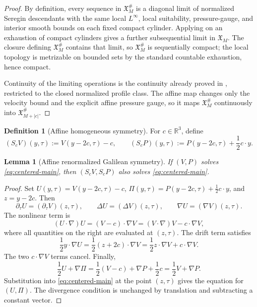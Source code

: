 \documentclass[11pt]{amsart}
\numberwithin{equation}{section}
\theoremstyle{plain}
\newtheorem{lemma}[lemma]{Lemma}
\theoremstyle{definition}
\newtheorem{definition}[definition]{Definition}
\theoremstyle{remark}
\newcommand{\R}{\mathbb R}
\begin{document}
\begin{proof}
By definition, every sequence in \(\mathfrak X_M^\#\) is a diagonal limit of
normalized Seregin descendants with the same local \(L^\infty\), local
suitability, pressure-gauge, and interior smooth bounds on each fixed compact
cylinder.  Applying  on an exhaustion of
compact cylinders gives a further subsequential limit in \(\mathfrak X_M\).  The
closure defining \(\mathfrak X_M^\#\) contains that limit, so
\(\mathfrak X_M^\#\) is sequentially compact; the local topology is metrizable on
bounded sets by the standard countable exhaustion, hence compact.

Continuity of the limiting operations is the continuity already proved in
, restricted to the closed normalized
profile class.  The affine map changes only the velocity bound and the explicit
affine pressure gauge, so it maps \(\mathfrak X_M^\#\) continuously into
\(\mathfrak X_{M+|c|}^\#\).
\end{proof}

\begin{definition}[Affine homogeneous symmetry]
\label{def:affine-symmetry}
For \(c\in\R^3\), define
\[
   (S_cV)(y,\tau):=V(y-2c,\tau)-c,
   \qquad
   (S_cP)(y,\tau):=P(y-2c,\tau)+\frac12 c\cdot y .
\]
\end{definition}

\begin{lemma}[Affine renormalized Galilean symmetry]
\label{lem:affine-symmetry}
If \((V,P)\) solves \eqref{eq:centered-main}, then
\((S_cV,S_cP)\) also solves \eqref{eq:centered-main}.
\end{lemma}

\begin{proof}
Set \(U(y,\tau)=V(y-2c,\tau)-c\),
\(\Pi(y,\tau)=P(y-2c,\tau)+\frac12c\cdot y\), and \(z=y-2c\).  Then
\[
   \partial_\tau U=(\partial_\tau V)(z,\tau),
   \qquad \Delta U=(\Delta V)(z,\tau),
   \qquad \nabla U=(\nabla V)(z,\tau).
\]
The nonlinear term is
\[
   (U\cdot\nabla)U=(V-c)\cdot\nabla V
   =(V\cdot\nabla)V-c\cdot\nabla V,
\]
where all quantities on the right are evaluated at \((z,\tau)\).  The drift
term satisfies
\[
   \frac12 y\cdot\nabla U
   =\frac12(z+2c)\cdot\nabla V
   =\frac12z\cdot\nabla V+c\cdot\nabla V.
\]
The two \(c\cdot\nabla V\) terms cancel.  Finally,
\[
   \frac12U+\nabla\Pi
   =
   \frac12(V-c)+\nabla P+\frac12c
   =
   \frac12V+\nabla P.
\]
Substitution into \eqref{eq:centered-main} at the point \((z,\tau)\) gives the
equation for \((U,\Pi)\).  The divergence condition is unchanged by translation
and subtracting a constant vector.
\end{proof}
\end{document}

